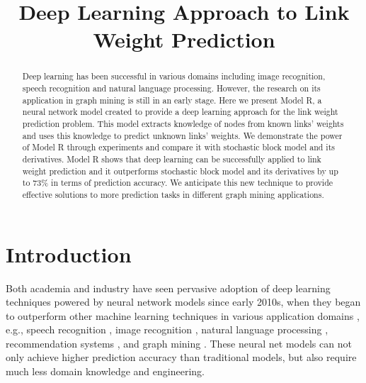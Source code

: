 \documentclass[conference]{IEEEtran}
\begin{document}
	\title{Deep Learning Approach to Link Weight Prediction}
	\author{
		\and
	}
	\maketitle

\begin{abstract}
	Deep learning has been successful in various domains 
	including image recognition, speech recognition and natural language 
	processing.
	However, the research on its application in graph mining is 
	still in an early stage.
	Here we present Model R, a neural network model created to provide a deep 
	learning approach for the link weight prediction problem.
	This model extracts knowledge of nodes from known links' weights and 
	uses this knowledge to predict unknown links' weights.
	We demonstrate the power of Model R through experiments and compare it with 
	stochastic block model and its derivatives.
	Model R shows that deep learning can be successfully applied to 
	link weight prediction and it outperforms stochastic block model and its derivatives by up to 73\% in terms of prediction accuracy.
	We anticipate this new technique to provide effective solutions to more 
	prediction tasks in different graph mining applications.
\end{abstract}

\section{Introduction}
Both academia and industry have seen pervasive adoption of deep learning 
techniques powered by neural network models since early 2010s,
when they began to outperform other machine learning techniques in various 
application domains \cite{lecun2015deep}, e.g.,
speech recognition \cite{hannun2014deep},
image recognition \cite{simonyan2014very},
natural language processing \cite{yao2013recurrent},
recommendation systems \cite{barkan2016item2vec},
and graph mining \cite{grovernode2vec}.
These neural net models can not only achieve higher prediction accuracy than 
traditional models,
but also require much less domain knowledge and engineering.
\end{document}
